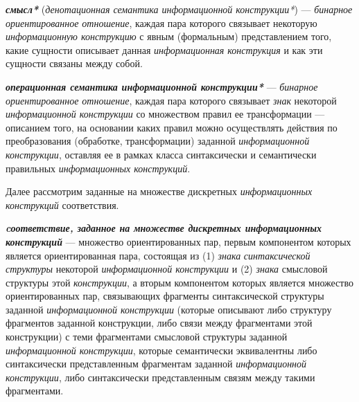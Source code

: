 \textit{\textbf{смысл*}} (\textit{денотационная семантика информационной конструкции*}) --- \textit{бинарное ориентированное отношение}, каждая пара которого связывает некоторую \textit{информационную конструкцию} с явным (формальным) представлением того, какие сущности описывает данная \textit{информационная конструкция} и как эти сущности связаны между собой.

\textit{\textbf{операционная семантика информационной конструкции*}} --- \textit{бинарное ориентированное отношение}, каждая пара которого связывает \textit{знак} некоторой \textit{информационной конструкции} со множеством правил ее трансформации --- описанием того, на основании каких правил можно осуществлять действия по преобразования (обработке, трансформации) заданной \textit{информационной конструкции}, оставляя ее в рамках класса синтаксически и семантически правильных \textit{информационных конструкций}.

\begin{SCn}


\end{SCn}

Далее рассмотрим заданные на множестве дискретных \textit{информационных конструкций} соответствия.

\begin{SCn}

    \begin{scnindent}
    \end{scnindent}

\end{SCn}

\textit{\textbf{cоответствие, заданное на множестве дискретных информационных конструкций}} --- множество ориентированных пар, первым компонентом которых является ориентированная пара, состоящая из (1) \textit{знака} \textit{синтаксической структуры} некоторой \textit{информационной конструкции} и (2) \textit{знака} смысловой структуры этой \textit{конструкции}, а вторым компонентом которых является множество ориентированных пар, связывающих фрагменты синтаксической структуры заданной \textit{информационной конструкции} (которые описывают либо структуру фрагментов заданной конструкции, либо связи между фрагментами этой конструкции) с теми фрагментами смысловой структуры заданной \textit{информационной конструкции}, которые семантически эквивалентны либо синтаксически представленным фрагментам заданной \textit{информационной конструкции}, либо синтаксически представленным связям между такими фрагментами.

